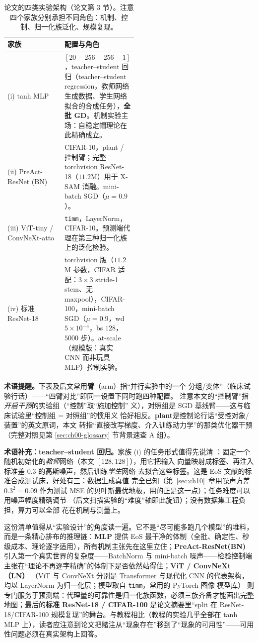 \begin{table}[!ht]
\centering\small
\caption{论文的四类实验架构（论文第 3
节）。注意四个家族分别承担不同角色：机制、控制、归一化族泛化、规模复现。}
\label{tab:ch03-arch}
\begin{tabular}{lp{0.52\linewidth}}
\toprule
家族 & 配置与角色 \\
\midrule
(i) tanh MLP & $[20\!-\!256\!-\!256\!-\!1]$，teacher--student 回归（teacher--student regression，教师网络生成数据、学生网络拟合的合成任务），\textbf{全批 GD}。机制实验主场：自稳定帽理论在此精确成立。 \\
(ii) PreAct-ResNet (BN) & CIFAR-10，plant / 控制臂；完整 torchvision ResNet-18（$11.2$M）用于 X-SAM 消融。mini-batch SGD（$\mu{=}0.9$）。 \\
(iii) ViT-tiny / ConvNeXt-atto & \texttt{timm}，LayerNorm，CIFAR-10。预测端代理在第三种归一化族上的泛化检验。 \\
(iv) 标准 ResNet-18 & torchvision 版（$11.2$M 参数，CIFAR 适配：$3{\times}3$ stride-1 stem、无 maxpool），CIFAR-100，mini-batch SGD（$\mu{=}0.9$，wd $5{\times}10^{-4}$，bs $128$，$5000$ 步）。at-scale（规模版：真实 CNN 而非玩具 MLP）控制实验。 \\
\bottomrule
\end{tabular}
\end{table}

\textbf{术语提醒。}下表及后文常用\textbf{臂}（arm）指“并行实验中的一个
分组/变体”（临床试验行话）——“四臂对比”即同一设置下同时跑四种配置。
注意本文的“控制臂”指\emph{开启干预}的实验组（“控制”取“施加控制”
义），对照组是 SGD 基线臂——这与临床试验里“控制组 = 对照组”的惯用义
恰好相反。\textbf{plant}是控制论行话“受控对象/装置”的英文原词，本文
转指“直接改写梯度、介入训练动力学”的那类优化器干预（完整对照见第
\ref{sec:ch00-glossary} 节背景速查 A 组）。

\textbf{术语补充：teacher--student 回归。}家族 (i) 的任务形式值得先说清
：固定一个随机初始化的\emph{教师}网络（本文 $[128,128]$），用它把输入
向量映射成标签、再注入标准差 $0.3$ 的高斯噪声，然后训练\emph{学生}网络
去拟合这些标签。这是 EoS 文献的标准合成测试床，好处有三：数据生成真值
完全已知（第~\ref{sec:ch10}~章用噪声方差 $0.3^{2}=0.09$ 作为测试 MSE
的贝叶斯最优地板，用的正是这一点）；任务难度可以用噪声幅度精确调节
（后文扫描实验的“难度”轴即此旋钮）；没有数据集工程负担，算力可以全部
花在机制与测量上。

这份清单值得从“实验设计”的角度读一遍。它不是“尽可能多跑几个模型”的堆料，而是一条精心排布的推理链：\textbf{MLP}
提供 EoS
最干净的体制（全批、确定性、秒级成本、理论逐字适用），所有机制主张先在这里立住；\textbf{PreAct-ResNet(BN)}
引入第一个真实世界的复杂度——BatchNorm 与 mini-batch
噪声——检验控制端主张在“理论不再逐字精确”的体制下是否依然站得住；\textbf{ViT /
ConvNeXt（LN）}
（ViT 与 ConvNeXt 分别是 Transformer 与现代化 CNN 的代表架构，均以
LayerNorm 为归一化层；模型取自 \texttt{timm}，常用的 PyTorch 图像
模型库）
则专门服务于预测端：代理量的可靠性是归一化族函数，必须三族齐备才能画出完整地图；最后的\textbf{标准
ResNet-18 / CIFAR-100} 是论文摘要里“split 在 ResNet-18/CIFAR-100
规模复现”的舞台。与教程相比（教程的实验几乎全部在 tanh MLP
上），读者应注意到论文把赌注从“现象存在”移到了“现象的可用性”——可用性问题必须在真实架构上回答。

